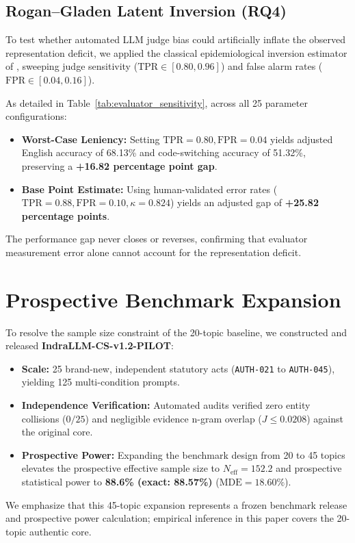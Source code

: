 \documentclass[11pt]{article}
\begin{document}


\subsection{Rogan--Gladen Latent Inversion (RQ4)}
To test whether automated LLM judge bias could artificially inflate the observed representation deficit, we applied the classical epidemiological inversion estimator of \citet{rogan1978estimating}, sweeping judge sensitivity ($\text{TPR} \in [0.80, 0.96]$) and false alarm rates ($\text{FPR} \in [0.04, 0.16]$).

As detailed in Table~\ref{tab:evaluator_sensitivity}, across all 25 parameter configurations:
\begin{itemize}
    \item \textbf{Worst-Case Leniency:} Setting $\text{TPR}=0.80, \text{FPR}=0.04$ yields adjusted English accuracy of 68.13\% and code-switching accuracy of 51.32\%, preserving a \textbf{+16.82 percentage point gap}.
    \item \textbf{Base Point Estimate:} Using human-validated error rates ($\text{TPR}=0.88, \text{FPR}=0.10, \kappa = 0.824$) yields an adjusted gap of \textbf{+25.82 percentage points}.
\end{itemize}
The performance gap never closes or reverses, confirming that evaluator measurement error alone cannot account for the representation deficit.

\section{Prospective Benchmark Expansion}
\label{sec:expansion}

To resolve the sample size constraint of the 20-topic baseline, we constructed and released \textbf{IndraLLM-CS-v1.2-PILOT}:
\begin{itemize}
    \item \textbf{Scale:} 25 brand-new, independent statutory acts (\texttt{AUTH-021} to \texttt{AUTH-045}), yielding 125 multi-condition prompts.
    \item \textbf{Independence Verification:} Automated audits verified zero entity collisions ($0/25$) and negligible evidence n-gram overlap ($J \le 0.0208$) against the original core.
    \item \textbf{Prospective Power:} Expanding the benchmark design from 20 to 45 topics elevates the prospective effective sample size to $N_{\text{eff}} = 152.2$ and prospective statistical power to \textbf{88.6\% (exact: 88.57\%)} ($\text{MDE} = 18.60\%$).
\end{itemize}
We emphasize that this 45-topic expansion represents a frozen benchmark release and prospective power calculation; empirical inference in this paper covers the 20-topic authentic core.
\end{document}
